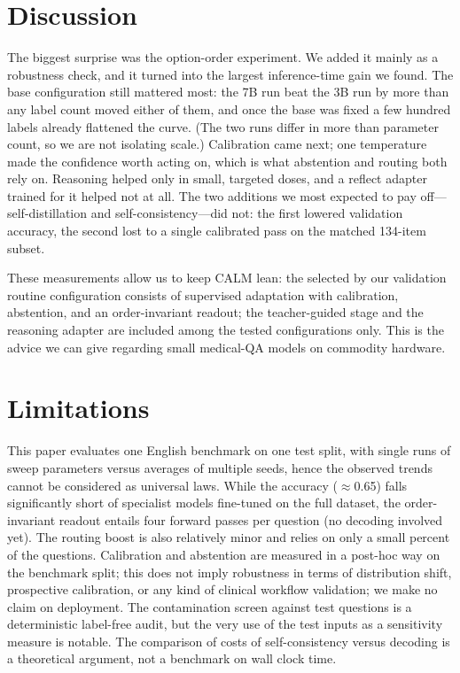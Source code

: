 \documentclass[conference]{IEEEtran}
\begin{document}
\section{Discussion}
The biggest surprise was the option-order experiment. We added it mainly as a robustness check, and it turned into the largest inference-time gain we found. The base configuration still mattered most: the 7B run beat the 3B run by more than any label count moved either of them, and once the base was fixed a few hundred labels already flattened the curve. (The two runs differ in more than parameter count, so we are not isolating scale.) Calibration came next; one temperature made the confidence worth acting on, which is what abstention and routing both rely on. Reasoning helped only in small, targeted doses, and a reflect adapter trained for it helped not at all. The two additions we most expected to pay off---self-distillation and self-consistency---did not: the first lowered validation accuracy, the second lost to a single calibrated pass on the matched 134-item subset.

These measurements allow us to keep CALM lean: the selected by our validation routine configuration consists of supervised adaptation with calibration, abstention, and an order-invariant readout; the teacher-guided stage and the reasoning adapter are included among the tested configurations only. This is the advice we can give regarding small medical-QA models on commodity hardware.

\section{Limitations}
This paper evaluates one English benchmark on one test split, with single runs of sweep parameters versus averages of multiple seeds, hence the observed trends cannot be considered as universal laws. While the accuracy ($\approx$0.65) falls significantly short of specialist models fine-tuned on the full dataset, the order-invariant readout entails four forward passes per question (no decoding involved yet). The routing boost is also relatively minor and relies on only a small percent of the questions. Calibration and abstention are measured in a post-hoc way on the benchmark split; this does not imply robustness in terms of distribution shift, prospective calibration, or any kind of clinical workflow validation; we make no claim on deployment. The contamination screen against test questions is a deterministic label-free audit, but the very use of the test inputs as a sensitivity measure is notable. The comparison of costs of self-consistency versus decoding is a theoretical argument, not a benchmark on wall clock time.
\end{document}
